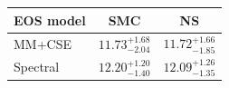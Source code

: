 \renewcommand{\arraystretch}{1.4}
\begin{tabular}{lcc}
    \hline
    EOS model & SMC & NS \\
    \hline
    MM+CSE & $11.73^{+1.68}_{-2.04}$ & $11.72^{+1.66}_{-1.85}$ \\
    Spectral & $12.20^{+1.20}_{-1.40}$ & $12.09^{+1.26}_{-1.35}$ \\
    \hline
\end{tabular}
